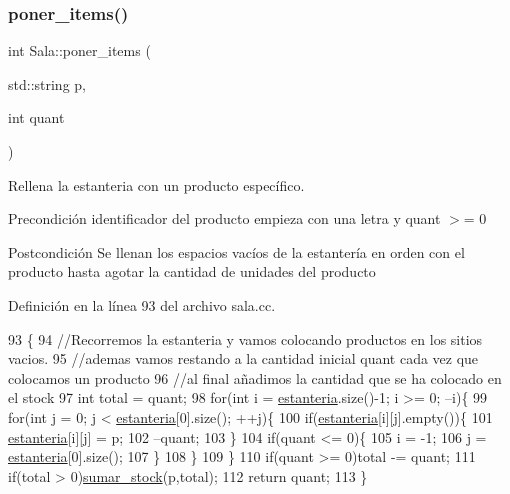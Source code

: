 \subsubsection{\texorpdfstring{poner\+\_\+items()}{poner\_items()}}
{\footnotesize\ttfamily int Sala\+::poner\+\_\+items (\begin{DoxyParamCaption}\item[{std\+::string}]{p,  }\item[{int}]{quant }\end{DoxyParamCaption})}



Rellena la estanteria con un producto específico. 

\begin{DoxyPrecond}{Precondición}
identificador del producto empieza con una letra y quant $>$= 0 
\end{DoxyPrecond}
\begin{DoxyPostcond}{Postcondición}
Se llenan los espacios vacíos de la estantería en orden con el producto hasta agotar la cantidad de unidades del producto 
\end{DoxyPostcond}


Definición en la línea 93 del archivo sala.\+cc.


\begin{DoxyCode}
93                                          \{
94     \textcolor{comment}{//Recorremos la estanteria y vamos colocando productos en los sitios vacios.}
95     \textcolor{comment}{//ademas vamos restando a la cantidad inicial quant cada vez que colocamos un producto}
96     \textcolor{comment}{//al final añadimos la cantidad que se ha colocado en el stock }
97     \textcolor{keywordtype}{int} total = quant; 
98     \textcolor{keywordflow}{for}(\textcolor{keywordtype}{int} i = \mbox{\hyperlink{class_sala_a8f5264818c98db9c0d075c51a7672d95}{estanteria}}.size()-1; i >= 0; --i)\{
99         \textcolor{keywordflow}{for}(\textcolor{keywordtype}{int} j = 0; j < \mbox{\hyperlink{class_sala_a8f5264818c98db9c0d075c51a7672d95}{estanteria}}[0].size(); ++j)\{
100             \textcolor{keywordflow}{if}(\mbox{\hyperlink{class_sala_a8f5264818c98db9c0d075c51a7672d95}{estanteria}}[i][j].empty())\{
101                 \mbox{\hyperlink{class_sala_a8f5264818c98db9c0d075c51a7672d95}{estanteria}}[i][j] = p;
102                 --quant;
103             \}
104             \textcolor{keywordflow}{if}(quant <= 0)\{
105                 i = -1;
106                 j = \mbox{\hyperlink{class_sala_a8f5264818c98db9c0d075c51a7672d95}{estanteria}}[0].size();
107             \}  
108         \}
109     \}      
110     \textcolor{keywordflow}{if}(quant >= 0)total -= quant;
111     \textcolor{keywordflow}{if}(total > 0)\mbox{\hyperlink{class_sala_a91e0acab4f56f3a5cbcad80afe163de8}{sumar\_stock}}(p,total);
112     \textcolor{keywordflow}{return} quant;
113 \}
\end{DoxyCode}
\mbox{\label{class_sala_afcdc6c283e5fca9632f279142ad613c3}} 
